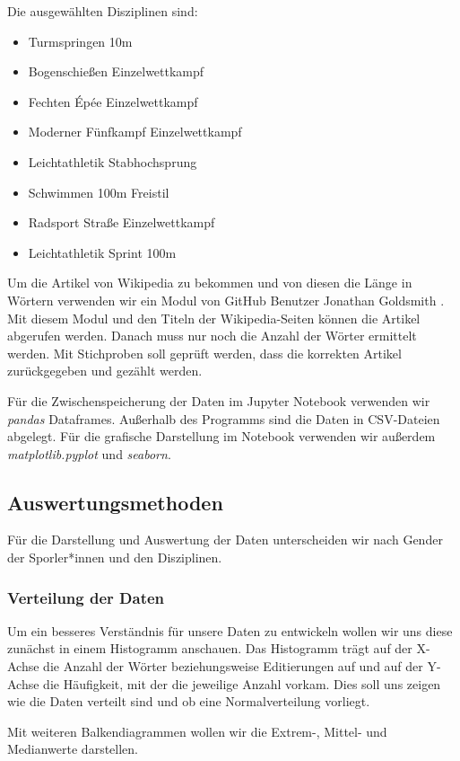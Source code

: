 \documentclass[11pt]{article}
\begin{document}
Die ausgewählten Disziplinen sind:
\begin{itemize}
\item Turmspringen 10m
\item Bogenschießen Einzelwettkampf
\item Fechten Épée Einzelwettkampf
\item Moderner Fünfkampf Einzelwettkampf
\item Leichtathletik Stabhochsprung
\item Schwimmen 100m Freistil
\item Radsport Straße Einzelwettkampf
\item Leichtathletik Sprint 100m
\end{itemize}

Um die Artikel von Wikipedia zu bekommen und von diesen die Länge in Wörtern verwenden wir ein Modul von GitHub Benutzer Jonathan Goldsmith \parencite{goldsmith}. Mit diesem Modul und den Titeln der Wikipedia-Seiten können die Artikel abgerufen werden. Danach muss nur noch die Anzahl der Wörter ermittelt werden. Mit Stichproben soll geprüft werden, dass die korrekten Artikel zurückgegeben und gezählt werden.

Für die Zwischenspeicherung der Daten im Jupyter Notebook verwenden wir \textit{pandas} Dataframes. Außerhalb des Programms sind die Daten in CSV-Dateien abgelegt. Für die grafische Darstellung im Notebook verwenden wir außerdem \textit{matplotlib.pyplot} und \textit{seaborn}.

\subsection {Auswertungsmethoden}
Für die Darstellung und Auswertung der Daten unterscheiden wir nach Gender der Sporler*innen und den Disziplinen.

\subsubsection {Verteilung der Daten}
Um ein besseres Verständnis für unsere Daten zu entwickeln wollen wir uns diese zunächst in einem Histogramm anschauen. Das Histogramm trägt auf der X-Achse die Anzahl der Wörter beziehungsweise Editierungen auf und auf der Y-Achse die Häufigkeit, mit der die jeweilige Anzahl vorkam. Dies soll uns zeigen wie die Daten verteilt sind und ob eine Normalverteilung vorliegt.

Mit weiteren Balkendiagrammen wollen wir die Extrem-, Mittel- und Medianwerte darstellen.
\end{document}

